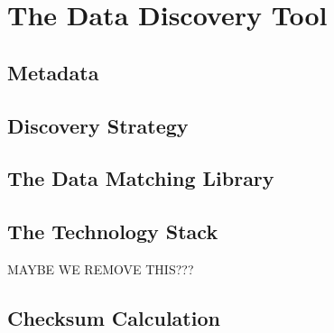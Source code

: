 \chapter{The Data Discovery Tool}\label{ch:ch2label}


\section{Metadata}



\section{Discovery Strategy}



\section{The Data Matching Library}



\section{The Technology Stack}
MAYBE WE REMOVE THIS???


\section{Checksum Calculation}



